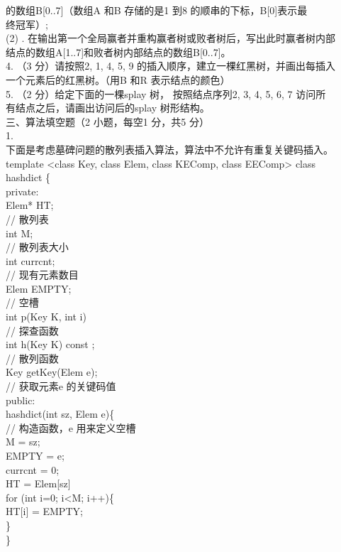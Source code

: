 \begin{question}
的数组B[0..7]（数组A 和B 存储的是1 到8 的顺串的下标，B[0]表示最\\
终冠军）;\\
(2) . 在输出第一个全局赢者并重构赢者树或败者树后，写出此时赢者树内部\\
结点的数组A[1..7]和败者树内部结点的数组B[0..7]。\\
4. （3 分）请按照2, 1, 4, 5, 9 的插入顺序，建立一棵红黑树，并画出每插入\\
一个元素后的红黑树。（用B 和R 表示结点的颜色）\\
5. （2 分）给定下面的一棵splay 树， 按照结点序列2, 3, 4, 5, 6, 7 访问所\\
有结点之后，请画出访问后的splay 树形结构。\\
三、算法填空题（2 小题，每空1 分，共5 分）\\
1.\\
下面是考虑墓碑问题的散列表插入算法，算法中不允许有重复关键码插入。\\
template <class Key, class Elem, class KEComp, class EEComp> class\\
hashdict  \{\\
private:\\
Elem* HT;\\
// 散列表\\
int M;\\
// 散列表大小\\
int currcnt;\\
// 现有元素数目\\
Elem EMPTY;\\
// 空槽\\
int p(Key K, int i)\\
// 探查函数\\
int h(Key K) const ;\\
// 散列函数\\
Key getKey(Elem e);\\
// 获取元素e 的关键码值\\
public:\\
hashdict(int sz, Elem e)\{\\
// 构造函数，e 用来定义空槽\\
M = sz;\\
EMPTY = e;\\
currcnt = 0;\\
HT = Elem[sz]\\
for (int i=0; i<M; i++)\{\\
HT[i] = EMPTY;\\
\}\\
\}\\

\end{question}
